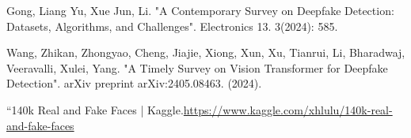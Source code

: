 \documentclass{svproc}
\begin{document}
\begin{thebibliography}{6}
	Gong, Liang Yu, Xue Jun, Li. "A Contemporary Survey on Deepfake Detection: Datasets, Algorithms, and Challenges". Electronics 13. 3(2024): 585.

Wang, Zhikan, Zhongyao, Cheng, Jiajie, Xiong, Xun, Xu, Tianrui, Li, Bharadwaj, Veeravalli, Xulei, Yang. "A Timely Survey on Vision Transformer for Deepfake Detection". arXiv preprint arXiv:2405.08463. (2024).



“140k Real and Fake Faces | Kaggle.\url{https://www.kaggle.com/xhlulu/140k-real-and-fake-faces}


\end{thebibliography}
\end{document}
